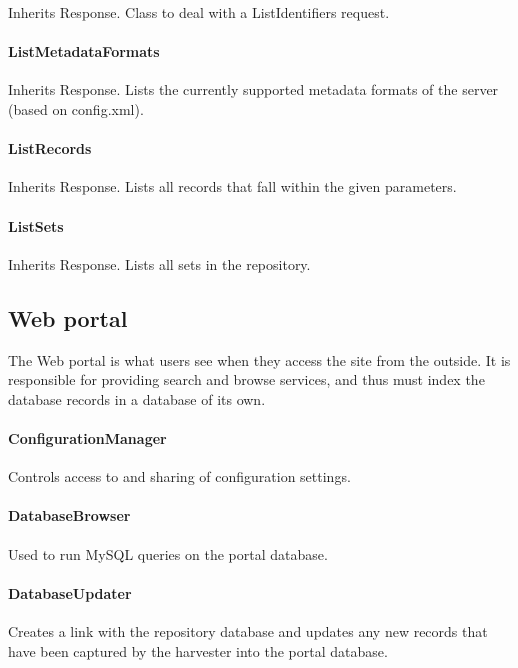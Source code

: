 \documentclass[a4paper,11pt]{article}
\begin{document}
Inherits Response. Class to deal with a ListIdentifiers request.

\paragraph{ListMetadataFormats}

Inherits Response. Lists the currently supported metadata formats of the server (based on config.xml).

\paragraph{ListRecords}

Inherits Response. Lists all records that fall within the given parameters.

\paragraph{ListSets}

Inherits Response. Lists all sets in the repository.

\subsection{Web portal}
\label{sec:class_summaries:web_portal}

The Web portal is what users see when they access the site from the outside. It is responsible for providing search and browse services, and thus must index the database records in a database of its own.

\paragraph{ConfigurationManager}

Controls access to and sharing of configuration settings.

\paragraph{DatabaseBrowser}

Used to run MySQL queries on the portal database.

\paragraph{DatabaseUpdater}

Creates a link with the repository database and updates any new records that have been captured by the harvester into the portal database.
\end{document}
